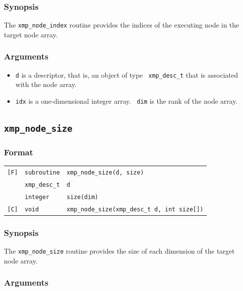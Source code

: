 \subsubsection*{Synopsis}

The {\tt xmp\_node\_index} routine provides the indices of the
executing node in the target node array.

\subsubsection*{Arguments}

\begin{itemize}
 \item {\tt d} is a descriptor, that is, an object of type {\tt
       xmp\_desc\_t} that is associated with the node array.
 \item {\tt idx} is a one-dimensional integer array. {\tt
       dim} is the rank of the node array.
\end{itemize}


\subsection{\tt xmp\_node\_size}

\subsubsection*{Format}

\begin{tabular}{lll}

\verb![F]!& {\tt subroutine}& {\tt xmp\_node\_size(d, size)}\\
          & {\tt xmp\_desc\_t} & {\tt d}\\
          & {\tt integer} & {\tt size(dim)}\\

\verb![C]!&  {\tt void}& {\tt xmp\_node\_size(xmp\_desc\_t d, int size[])}\\

\end{tabular}

\subsubsection*{Synopsis}

The {\tt xmp\_node\_size} routine provides the size of each dimension of
the target node array.

\subsubsection*{Arguments}

